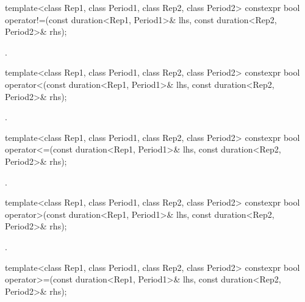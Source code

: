 %
\begin{itemdecl}
template<class Rep1, class Period1, class Rep2, class Period2>
  constexpr bool operator!=(const duration<Rep1, Period1>& lhs,
                            const duration<Rep2, Period2>& rhs);
\end{itemdecl}

\begin{itemdescr}
\pnum
\returns {}.
\end{itemdescr}

%
\begin{itemdecl}
template<class Rep1, class Period1, class Rep2, class Period2>
  constexpr bool operator<(const duration<Rep1, Period1>& lhs,
                           const duration<Rep2, Period2>& rhs);
\end{itemdecl}

\begin{itemdescr}
\pnum
\returns {}.
\end{itemdescr}

%
\begin{itemdecl}
template<class Rep1, class Period1, class Rep2, class Period2>
  constexpr bool operator<=(const duration<Rep1, Period1>& lhs,
                            const duration<Rep2, Period2>& rhs);
\end{itemdecl}

\begin{itemdescr}
\pnum
\returns {}.
\end{itemdescr}

%
\begin{itemdecl}
template<class Rep1, class Period1, class Rep2, class Period2>
  constexpr bool operator>(const duration<Rep1, Period1>& lhs,
                           const duration<Rep2, Period2>& rhs);
\end{itemdecl}

\begin{itemdescr}
\pnum
\returns {}.
\end{itemdescr}

%
\begin{itemdecl}
template<class Rep1, class Period1, class Rep2, class Period2>
  constexpr bool operator>=(const duration<Rep1, Period1>& lhs,
                            const duration<Rep2, Period2>& rhs);
\end{itemdecl}

